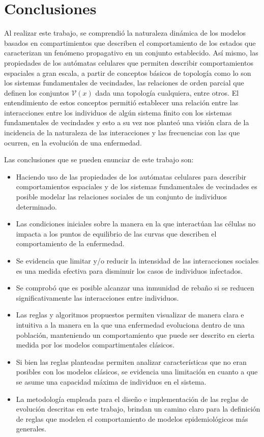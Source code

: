 \chapter{Conclusiones}

Al realizar este trabajo, se comprendió la naturaleza dinámica de los modelos basados en compartimientos que describen el comportamiento de los estados que caracterizan un fenómeno propagativo en un conjunto establecido. Así mismo, las propiedades de los autómatas celulares que permiten describir comportamientos espaciales a gran escala, a partir de conceptos básicos de topología como lo son los sistemas fundamentales de vecindades, las relaciones de orden parcial que definen los conjuntos $\mathcal{V}(x)$ dada una topología cualquiera, entre otros. El entendimiento de estos conceptos permitió establecer una relación entre las interacciones entre los individuos de algún sistema finito con los sistemas fundamentales de vecindades y esto a su vez nos planteó una visión clara de la incidencia de la naturaleza de las interacciones y las frecuencias con las que ocurren,
en la evolución de una enfermedad.

Las conclusiones que se pueden enunciar de este trabajo son:
\begin{itemize}
    \item Haciendo uso de las propiedades de los autómatas celulares para describir comportamientos espaciales y de los sistemas fundamentales de vecindades es posible modelar las relaciones sociales de un conjunto de individuos determinado.
    \item Las condiciones iniciales sobre la manera en la que interactúan las células no impacta a los puntos de equilibrio de las curvas que describen el comportamiento de la enfermedad.
    \item Se evidencia que limitar y/o reducir la intensidad de las interacciones sociales es una medida efectiva para disminuir los casos de individuos infectados.
    \item Se comprobó que es posible alcanzar una inmunidad de rebaño si se reducen significativamente las interacciones entre individuos.
    \item Las reglas y algoritmos propuestos permiten visualizar de manera clara e intuitiva a la manera en la que una enfermedad evoluciona dentro de una población, manteniendo un comportamiento que puede ser descrito en cierta medida por los modelos compartimentales clásicos.
    \item Si bien las reglas planteadas permiten analizar características que no eran posibles con los modelos clásicos, se evidencia una limitación en cuanto a que se asume una capacidad máxima de individuos en el sistema.
    \item La metodología empleada para el diseño e implementación de las reglas de evolución descritas en este trabajo, brindan un camino claro para la definición de reglas que modelen el comportamiento de modelos epidemiológicos más generales.
\end{itemize}